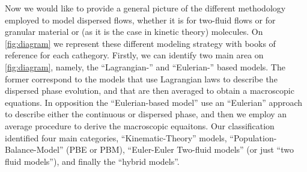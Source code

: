 Now we would like to provide a general picture of the different methodology employed to model dispersed flows, whether it is for two-fluid flows or for granular material or (as it is the case in kinetic theory) molecules. 
On \ref{fig:diagram} we represent these different modeling strategy with books of reference for each cathegory. 
Firstly, we can identify two main area on \ref{fig:diagram}, namely, the ``Lagrangian-'' and ``Eulerian-'' based models. 
The former correspond to the models that use Lagrangian laws to describe the dispersed phase evolution, and that are then averaged to obtain a macroscopic equations. 
In opposition the ``Eulerian-based model'' use an ``Eulerian'' approach to describe either the continuous or dispersed phase, and then we employ an average procedure to derive the macroscopic equaitons. 
Our classification identified four main categories, ``Kinematic-Theory'' models, ``Population-Balance-Model'' (PBE or PBM), ``Euler-Euler Two-fluid models'' (or just ``two fluid models''), and finally the ``hybrid models''. 
